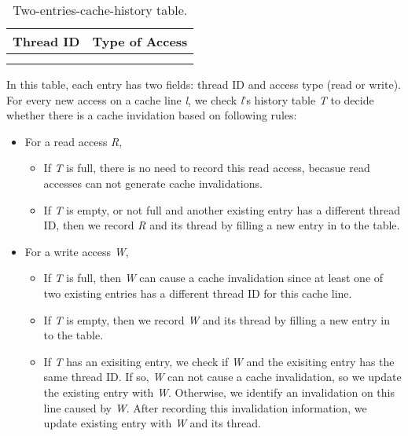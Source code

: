 \begin{table}
\centering
  \begin{tabular}{ l | r }
    \hline
    {Thread ID} & {Type of Access} \\ \hline
    \hline
     &   \\ \hline
     &   \\ \hline
  \end{tabular}
  \caption{Two-entries-cache-history table. \label{table:cachehistory}}
\end{table} 

In this table, each entry has two fields: thread ID and access type (read or write). 
For every new access on a cache line {\it l}, we check {\it l}'s history table
{\it T} to decide whether there is a cache invidation based on following rules:

\begin{itemize}
\item
  For a read access {\it R}, 
  \begin{itemize}
    \item
      If {\it T} is full, there is no need to record this read access, becasue
      read accesses can not generate cache invalidations.
    \item
      If {\it T} is empty, or not full and another existing entry has a different thread
      ID, then we record {\it R} and its thread by filling a new entry in to the table. 
  \end{itemize}
\item
  For a write access {\it W}, 
  \begin{itemize}
    \item
      If {\it T} is full, then {\it W} can cause a cache invalidation since at least 
      one of two existing entries has a different thread ID for this cache line. 
    \item
      If {\it T} is empty,
      then we record {\it W} and its thread by filling a new entry in to the table. 
    \item
      If {\it T} has an exisiting entry,
      we check if {\it W} and the exisiting entry has the same thread ID. If
      so, {\it W} can not cause a cache invalidation, so we update the existing
      entry with {\it W}. Otherwise, we identify an invalidation on this line caused by
      {\it W}. After recording this invalidation information, we update 
      existing entry with {\it W} and its thread.
  \end{itemize}
\end{itemize}

